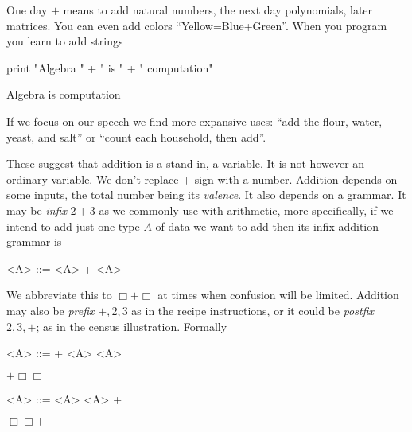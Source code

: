 One day  $+$ means to add natural numbers, the next day 
polynomials, later matrices.  
You can even add colors ``Yellow=Blue+Green''. When you program 
you learn to add strings
\begin{center}
\begin{notebookin}
print "Algebra " + " is " + " computation"
\end{notebookin}
\begin{notebookout}
Algebra is computation
\end{notebookout}
\end{center}
If we focus on our 
speech we find more expansive uses:
``add the flour, water, yeast, and salt'' or  
``count each household, then add''.

These suggest that addition is a stand in, a variable.  It is not however 
an ordinary variable.  We don't replace $+$ sign with a number.  
Addition depends on some inputs, the total 
number being its \emph{valence}.    It also depends on a grammar.
It may be \emph{infix} $2+3$ as we commonly 
use with arithmetic, more specifically, if we intend to add just one type 
$A$ of data we want to add then its infix addition grammar is
\begin{center}
    \begin{minipage}{0.4\textwidth}
\begin{Gcode}[]
<A> ::= <A> + <A> 
\end{Gcode}
\end{minipage}
\end{center}
We abbreviate this to $\Box+\Box$ at times when confusion will be limited.
Addition may also be \emph{prefix} $+,2,3$ as in the recipe instructions,
or it could be \emph{postfix} $2,3,+$; as in the census illustration. 
Formally
\begin{center}
\begin{minipage}{0.4\textwidth}
\centering
\begin{Gcode}[]
<A> ::= + <A> <A> 
\end{Gcode}
$+ \Box \Box$
\end{minipage}
\hfill
\begin{minipage}{0.4\textwidth}
\centering
\begin{Gcode}[]
<A> ::= <A> <A> +
\end{Gcode}
$\Box \Box +$
\end{minipage}    
\end{center}    

